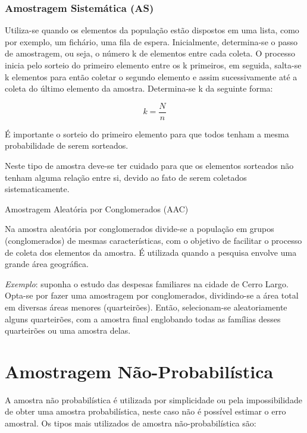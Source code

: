 \documentclass[12pt,brazil,oneside]{book}
\begin{document}
\hypertarget{amostragem-sistematica-as}{%
\subsubsection{Amostragem Sistemática (AS)}\label{amostragem-sistematica-as}}

Utiliza-se quando os elementos da população estão dispostos em uma lista, como por exemplo, um
fichário, uma fila de espera. Inicialmente, determina-se o passo de amostragem, ou seja, o número k de
elementos entre cada coleta. O processo inicia pelo sorteio do primeiro elemento entre os k primeiros, em
seguida, salta-se k elementos para então coletar o segundo elemento e assim sucessivamente até a coleta
do último elemento da amostra. Determina-se k da seguinte forma:

\[ 
k=\frac{N}{n}
\]

É importante o sorteio do primeiro elemento para que todos tenham a mesma probabilidade de
serem sorteados.

Neste tipo de amostra deve-se ter cuidado para que os elementos sorteados não tenham alguma
relação entre si, devido ao fato de serem coletados sistematicamente.

Amostragem Aleatória por Conglomerados (AAC)

Na amostra aleatória por conglomerados divide-se a população em grupos (conglomerados) de mesmas características, com o objetivo de facilitar o processo de coleta dos elementos da amostra. É utilizada quando a pesquisa envolve uma grande área geográfica.

\emph{Exemplo}: suponha o estudo das despesas familiares na cidade de Cerro Largo. Opta-se por fazer uma amostragem por conglomerados, dividindo-se a área total em diversas áreas menores (quarteirões). Então, selecionam-se aleatoriamente alguns quarteirões, com a amostra final englobando todas as famílias desses quarteirões ou uma amostra delas.

\hypertarget{amostragem-nao-probabilistica}{%
\section{Amostragem Não-Probabilística}\label{amostragem-nao-probabilistica}}

A amostra não probabilística é utilizada por simplicidade ou pela impossibilidade de obter uma amostra probabilística, neste caso não é possível estimar o erro amostral. Os tipos mais utilizados de amostra não-probabilística são:
\end{document}
